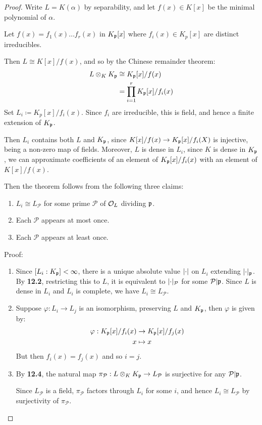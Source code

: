 \documentclass[10pt,a4paper]{article}
\begin{document}
\begin{proof}
  Write $L = K(\alpha)$ by separability, and let $f(x) \in K[x]$ be the minimal polynomial of $\alpha$.

  Let $f(x) = f_1(x)\ldots f_r(x)$ in $K_{\mathfrak{p}}[x]$ where $f_i(x) \in K_p[x]$ are distinct irreducibles.

  Then $L \cong K[x]/f(x)$, and so by the Chinese remainder theorem:
  \begin{align*}
    L \otimes_K K_{\mathfrak{p}} &\cong K_{\mathfrak{p}}[x]/f(x)\\
    &= \prod_{i=1}^r K_{\mathfrak{p}}[x]/f_i(x)
  \end{align*}
  Set $L_i \coloneqq K_p[x]/f_i(x)$. Since $f_i$ are irreducible, this is field, and hence a finite extension of $K_{\mathfrak{p}}$.

  Then $L_i$ contains both $L$ and $K_{\mathfrak{p}}$, since $K[x]/f(x) \to K_{\mathfrak{p}}[x]/f_i(X)$ is injective, being a non-zero map of fields. Moreover, $L$ is dense in $L_i$, since $K$ is dense in $K_{\mathfrak{p}}$, we can approximate coefficients of an element of $K_{\mathfrak{p}}[x]/f_i(x)$ with an element of $K[x]/f(x)$.

  Then the theorem follows from the following three claims:
  \begin{enumerate}
    \item $L_i \cong L_\mathcal{P}$ for some prime $\mathcal{P}$ of $\mathcal{O}_L$ dividing $\mathfrak{p}$.
    \item Each $\mathcal{P}$ appears at most once.
    \item Each $\mathcal{P}$ appears at least once.
  \end{enumerate}
  Proof:
  \begin{enumerate}
    \item Since $[L_i : K_{\mathfrak{p}}] < \infty$, there is a unique absolute value $\lvert\cdot\rvert$ on $L_i$ extending $\lvert\cdot\rvert_{\mathfrak{p}}$. By \textbf{12.2}, restricting this to $L$, it is equivalent to $\lvert\cdot\rvert_\mathcal{P}$ for some $\mathcal{P}|\mathfrak{p}$. Since $L$ is dense in $L_i$ and $L_i$ is complete, we have $L_i \cong L_{\mathcal{P}}$.

    \item Suppose $\varphi: L_i \to L_j$ is an isomorphism, preserving $L$ and $K_{\mathfrak{p}}$, then $\varphi$ is given by:
    \begin{align*}
      \varphi: K_{\mathfrak{p}}[x]/f_i(x) &\to K_{\mathfrak{p}}[x]/f_j(x)\\
      x &\mapsto x
    \end{align*}
    But then $f_i(x) = f_j(x)$ and so $i = j$.

    \item By \textbf{12.4}, the natural map $\pi_\mathcal{P}: L \otimes_K K_{\mathfrak{p}} \to L_\mathcal{P}$ is surjective for any $\mathcal{P}|\mathfrak{p}$.

    Since $L_{\mathcal{P}}$ is a field, $\pi_\mathcal{P}$ factors through $L_i$ for some $i$, and hence $L_i \cong L_{\mathcal{P}}$ by surjectivity of $\pi_{\mathcal{P}}$.
  \end{enumerate}
\end{proof}
\end{document}
